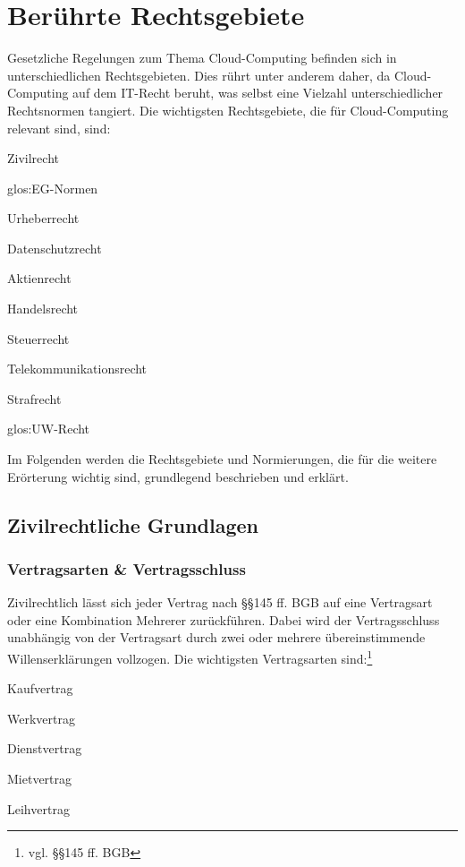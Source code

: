 \chapter{Ber\"uhrte Rechtsgebiete}
Gesetzliche Regelungen zum Thema Cloud-Computing befinden sich in unterschiedlichen Rechtsgebieten. Dies r\"uhrt unter anderem daher, da Cloud-Computing auf dem IT-Recht beruht, was selbst eine Vielzahl unterschiedlicher Rechtsnormen tangiert.
Die wichtigsten Rechtsgebiete, die f\"ur Cloud-Computing relevant sind, sind:
 \begin{seList}      
\item Zivilrecht
\item  \gls{glos:EG}-Normen
\item Urheberrecht
\item Datenschutzrecht
\item Aktienrecht
\item Handelsrecht
\item Steuerrecht
\item Telekommunikationsrecht
\item Strafrecht
\item \gls{glos:UW}-Recht
 \end{seList}      
Im Folgenden werden die Rechtsgebiete und Normierungen, die f\"ur die weitere Er\"orterung wichtig sind, grundlegend beschrieben und erkl\"art.

\section{Zivilrechtliche Grundlagen}
\subsection{Vertragsarten \& Vertragsschluss}
Zivilrechtlich l\"asst sich jeder Vertrag nach §§145 ff. BGB auf eine Vertragsart oder eine Kombination Mehrerer zur\"uckf\"uhren. Dabei wird der Vertragsschluss unabh\"angig von der Vertragsart durch zwei oder mehrere \"ubereinstimmende Willenserkl\"arungen vollzogen. Die wichtigsten Vertragsarten sind:\footnote{vgl.  §§145 ff. BGB}
 \begin{seList}                            
\item Kaufvertrag 
\item Werkvertrag
\item Dienstvertrag
\item Mietvertrag
\item Leihvertrag
\end{seList} 
\label{vertragsarten_u_vertragsschluss}

